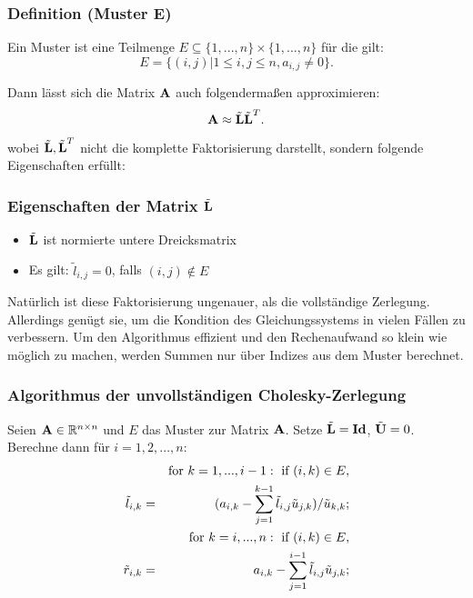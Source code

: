 \subsubsection{Definition (Muster E)}\label{sss.Muster E}

Ein Muster ist eine Teilmenge $E \subseteq \{1,...,n\} \times \{1,...,n\}$ für die gilt:
\begin{equation}
E = \{(i,j) | 1 \le i,j \le n, a_{i,j} \ne 0 \}.
\end{equation}

Dann lässt sich die Matrix ${\textbf{A}}$ auch folgendermaßen approximieren:
\begin{equation}
{\textbf{A}} \approx \tilde{{\textbf{L}}} \tilde{{\textbf{L}}}^{T}.
\end{equation}
wobei $\tilde{{\textbf{L}}}, \tilde{{\textbf{L}}}^{T}$ nicht die komplette Faktorisierung darstellt, sondern folgende Eigenschaften erfüllt:

\subsubsection{Eigenschaften der Matrix $\tilde{{\textbf{L}}}$}\label{sss.Eigenschaften L CZ}
\begin{itemize}
\item $\tilde{{\textbf{L}}}$ ist normierte untere Dreicksmatrix
\item Es gilt: $\tilde l_{i,j} = 0$, falls $(i,j) \notin E$
\end{itemize}

Natürlich ist diese Faktorisierung ungenauer, als die vollständige Zerlegung. Allerdings genügt sie, um die Kondition des Gleichungssystems in vielen Fällen zu verbessern. Um den Algorithmus effizient und den Rechenaufwand so klein wie möglich zu machen, werden Summen nur über Indizes aus dem Muster berechnet.

\subsubsection{Algorithmus der unvollständigen Cholesky-Zerlegung}\label{sss.Cholesky-Algorithmus}

Seien ${\textbf{A}} \in \mathbb{R}^{n \times n}$ und $E$ das Muster zur Matrix ${\textbf{A}}$. Setze $\tilde{{\textbf{L}}} = {\textbf{Id}}$, $\tilde{{\textbf{U}}} = 0$. Berechne dann für $i=1,2,...,n$:
\begin{eqnarray}
&&\textnormal{for } k = 1,...,i-1: \textnormal{ if } (i,k) \in E,\notag \\
\tilde l_{i,k} &=& (a_{i,k} - \sum_{j=1}^{k-1} \tilde l_{i,j} \tilde u_{j,k})/ \tilde u_{k,k}; \notag \\
&&\textnormal{for } k = i,...,n: \textnormal{ if } (i,k) \in E, \notag \\
\tilde r_{i,k} &=& a_{i,k} - \sum_{j=1}^{i-1} \tilde l_{i,j} \tilde u_{j,k}; \notag
\end{eqnarray}


